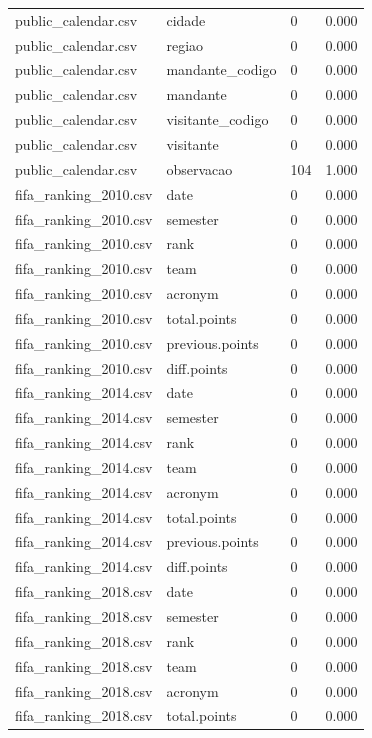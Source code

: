 \begin{tabular}{llll}
public\_calendar.csv & cidade & 0 & 0.000 \\
public\_calendar.csv & regiao & 0 & 0.000 \\
public\_calendar.csv & mandante\_codigo & 0 & 0.000 \\
public\_calendar.csv & mandante & 0 & 0.000 \\
public\_calendar.csv & visitante\_codigo & 0 & 0.000 \\
public\_calendar.csv & visitante & 0 & 0.000 \\
public\_calendar.csv & observacao & 104 & 1.000 \\
fifa\_ranking\_2010.csv & date & 0 & 0.000 \\
fifa\_ranking\_2010.csv & semester & 0 & 0.000 \\
fifa\_ranking\_2010.csv & rank & 0 & 0.000 \\
fifa\_ranking\_2010.csv & team & 0 & 0.000 \\
fifa\_ranking\_2010.csv & acronym & 0 & 0.000 \\
fifa\_ranking\_2010.csv & total.points & 0 & 0.000 \\
fifa\_ranking\_2010.csv & previous.points & 0 & 0.000 \\
fifa\_ranking\_2010.csv & diff.points & 0 & 0.000 \\
fifa\_ranking\_2014.csv & date & 0 & 0.000 \\
fifa\_ranking\_2014.csv & semester & 0 & 0.000 \\
fifa\_ranking\_2014.csv & rank & 0 & 0.000 \\
fifa\_ranking\_2014.csv & team & 0 & 0.000 \\
fifa\_ranking\_2014.csv & acronym & 0 & 0.000 \\
fifa\_ranking\_2014.csv & total.points & 0 & 0.000 \\
fifa\_ranking\_2014.csv & previous.points & 0 & 0.000 \\
fifa\_ranking\_2014.csv & diff.points & 0 & 0.000 \\
fifa\_ranking\_2018.csv & date & 0 & 0.000 \\
fifa\_ranking\_2018.csv & semester & 0 & 0.000 \\
fifa\_ranking\_2018.csv & rank & 0 & 0.000 \\
fifa\_ranking\_2018.csv & team & 0 & 0.000 \\
fifa\_ranking\_2018.csv & acronym & 0 & 0.000 \\
fifa\_ranking\_2018.csv & total.points & 0 & 0.000 \\

\end{tabular}
